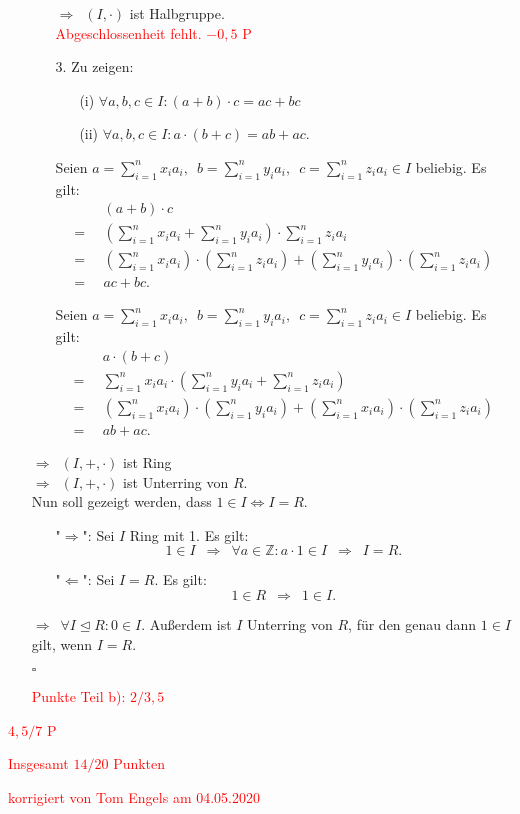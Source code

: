 \documentclass[12pt]{article}
\newcommand{\corr}[1]{\textcolor{red}{#1}}
\newcommand{\QED}{\begin{flushright} $\square$ \end{flushright}}
\newcommand{\df}{\Longrightarrow \enspace}
\begin{document}
\begin{enumerate}
\begin{enumerate}
$\df (I,\cdot)$ ist Halbgruppe.\\
\corr{Abgeschlossenheit fehlt. $-0,5$ P}

\item[3.] Zu zeigen:
\begin{enumerate}
	\item[(i)] $\forall a, b, c \in I: (a + b) \cdot c  = a c + b c$
	\item[(ii)] $\forall a, b, c \in I: a \cdot (b + c) = a b + a c$.
\end{enumerate}

Seien $a = \sum\limits_{i=1}^{n}x_i a_i, \enspace b = \sum\limits_{i=1}^{n}y_i a_i, \enspace c = \sum\limits_{i=1}^{n}z_i a_i \in I$ beliebig. Es gilt:
\begin{align*}
	&(a + b) \cdot c \\
	= \enspace &(\sum_{i=1}^{n}x_i a_i + \sum_{i=1}^{n}y_i a_i) \cdot \sum_{i=1}^{n}z_i a_i \\
	= \enspace &(\sum_{i=1}^{n}x_i a_i) \cdot (\sum_{i=1}^{n}z_i a_i) + (\sum_{i=1}^{n}y_i a_i) \cdot (\sum_{i=1}^{n}z_i a_i) \\
	= \enspace &a c + b c.
\end{align*}

Seien $a = \sum\limits_{i=1}^{n}x_i a_i, \enspace b = \sum\limits_{i=1}^{n}y_i a_i, \enspace c = \sum\limits_{i=1}^{n}z_i a_i \in I$ beliebig. Es gilt:
\begin{align*}
	&a \cdot (b + c) \\
	= \enspace &\sum_{i=1}^{n}x_i a_i \cdot (\sum_{i=1}^{n}y_i a_i + \sum_{i=1}^{n}z_i a_i) \\
	= \enspace &(\sum_{i=1}^{n}x_i a_i) \cdot (\sum_{i=1}^{n}y_i a_i) + (\sum_{i=1}^{n}x_i a_i) \cdot (\sum_{i=1}^{n}z_i a_i) \\
	= \enspace &a b + a c.
\end{align*}

\end{enumerate}

$\df (I,+,\cdot)$ ist Ring \\
$\df (I,+,\cdot)$ ist Unterring von $R$. \\

Nun soll gezeigt werden, dass $1 \in I \Longleftrightarrow I = R$.
\begin{enumerate}
	\item["$\Longrightarrow$":] Sei $I$ Ring mit 1. Es gilt:
	$$1 \in I \enspace \df \forall a \in \mathbb{Z}: a \cdot 1 \in I \enspace \df I = R.$$
	
	\item["$\Longleftarrow$":] Sei $I = R$. Es gilt:
	$$1 \in R \enspace \df 1 \in I.$$

\end{enumerate}

$\df \forall I \trianglelefteq R: 0 \in I.$ Außerdem ist
$I$ Unterring von $R$, für den genau dann $1 \in I$ gilt, wenn $I = R$. 
\QED
\corr{Punkte Teil b): $2/3,5$}


\end{enumerate}
\corr{$4,5/7$ P}

\bigskip

\corr{Insgesamt $14/20$ Punkten}


\bigskip

\corr{korrigiert von Tom Engels am 04.05.2020}
\end{document}
